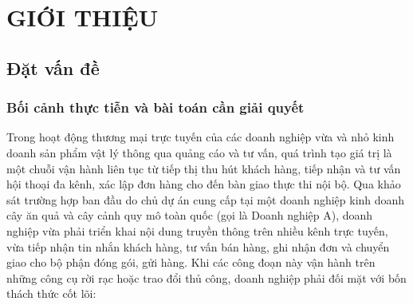 \chapter{GIỚI THIỆU}\label{chap:introduction}

\section{Đặt vấn đề}

\subsection{Bối cảnh thực tiễn và bài toán cần giải quyết}
Trong hoạt động thương mại trực tuyến của các doanh nghiệp vừa và nhỏ kinh doanh sản phẩm vật lý thông qua quảng cáo và tư vấn, quá trình tạo giá trị là một chuỗi vận hành liên tục từ tiếp thị thu hút khách hàng, tiếp nhận và tư vấn hội thoại đa kênh, xác lập đơn hàng cho đến bàn giao thực thi nội bộ. Qua khảo sát trường hợp ban đầu do chủ dự án cung cấp tại một doanh nghiệp kinh doanh cây ăn quả và cây cảnh quy mô toàn quốc (gọi là Doanh nghiệp A), doanh nghiệp vừa phải triển khai nội dung truyền thông trên nhiều kênh trực tuyến, vừa tiếp nhận tin nhắn khách hàng, tư vấn bán hàng, ghi nhận đơn và chuyển giao cho bộ phận đóng gói, gửi hàng. Khi các công đoạn này vận hành trên những công cụ rời rạc hoặc trao đổi thủ công, doanh nghiệp phải đối mặt với bốn thách thức cốt lõi:

